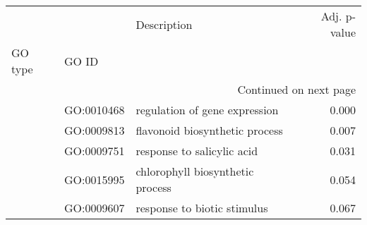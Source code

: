 \begin{longtable}{lllr}
\toprule
   &            &                       Description &  Adj. p-value \\
GO type & GO ID &                                   &               \\
\midrule
\endhead
\midrule
\multicolumn{4}{r}{{Continued on next page}} \\
\midrule
\endfoot

\bottomrule
\endlastfoot
\multirow{5}{*}{BP} & GO:0010468 &     regulation of gene expression &         0.000 \\
   & GO:0009813 &    flavonoid biosynthetic process &         0.007 \\
   & GO:0009751 &        response to salicylic acid &         0.031 \\
   & GO:0015995 &  chlorophyll biosynthetic process &         0.054 \\
   & GO:0009607 &       response to biotic stimulus &         0.067 \\
\end{longtable}
